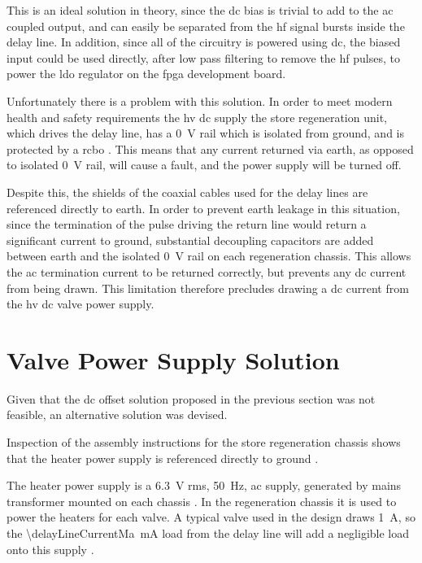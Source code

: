 This is an ideal solution in theory, since the \gls{dc} bias is trivial to add to the \gls{ac} coupled output, and can easily be separated from the \gls{hf} signal bursts inside the delay line. In addition, since all of the circuitry is powered using \gls{dc}, the biased input could be used directly, after low pass filtering to remove the \gls{hf} pulses, to power the \gls{ldo} regulator on the \gls{fpga} development board.

Unfortunately there is a problem with this solution. In order to meet modern health and safety requirements the \gls{hv} \gls{dc} supply the store regeneration unit, which drives the delay line, has a \SI{0}{\volt} rail which is isolated from ground, and is protected by a \gls{rcbo} \cite{passmore2015}. This means that any current returned via earth, as opposed to isolated \SI{0}{\volt} rail, will cause a fault, and the power supply will be turned off.

Despite this, the shields of the coaxial cables used for the delay lines are referenced directly to earth. In order to prevent earth leakage in this situation, since the termination of the pulse driving the return line would return a significant current to ground, substantial decoupling capacitors are added between earth and the isolated \SI{0}{\volt} rail on each regeneration chassis. This allows the \gls{ac} termination current to be returned correctly, but prevents any \gls{dc} current from being drawn. This limitation therefore precludes drawing a \gls{dc} current from the \gls{hv} \gls{dc} valve power supply.

\section{Valve Power Supply Solution} \label{sec:power-valve-supply}

Given that the \gls{dc} offset solution proposed in the previous section was not feasible, an alternative solution was devised.

Inspection of the assembly instructions for the store regeneration chassis shows that the heater power supply is referenced directly to ground \cite{burton2014a}.

The heater power supply is a \SI{6.3}{\volt} \gls{rms}, \SI{50}{\hertz}, \gls{ac} supply, generated by mains transformer mounted on each chassis \cite[p.1]{mullard} \cite[p.1]{passmore2015}. In the regeneration chassis it is used to power the heaters for each valve. A typical valve used in the design draws \SI{1}{\ampere}, so the \SI{\delayLineCurrentMa}{\milli\ampere} load from the delay line will add a negligible load onto this supply \cite[p.1]{mullard}.

